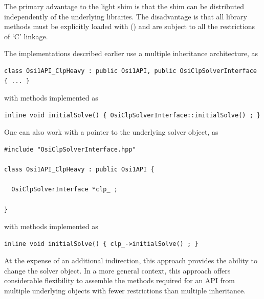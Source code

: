 \documentclass{article}
\newcommand{\OsiTwoOsi}{\pgmid{Osi2::Osi1API}\xspace}
\begin{document}
The primary advantage to the light shim is that the shim can be distributed
independently of the underlying libraries.
The disadvantage is that all library methods must be explicitly loaded with
 () and are subject to all the restrictions of
`C' linkage.

The \OsiTwoOsi implementations described earlier use a multiple inheritance
architecture, as
\begin{verbatim}
class Osi1API_ClpHeavy : public Osi1API, public OsiClpSolverInterface { ... }
\end{verbatim}
with methods implemented as
\begin{verbatim}
inline void initialSolve() { OsiClpSolverInterface::initialSolve() ; }
\end{verbatim}
One can also work with a pointer to the underlying solver object, as
\begin{verbatim}
#include "OsiClpSolverInterface.hpp"

class Osi1API_ClpHeavy : public Osi1API {

  OsiClpSolverInterface *clp_ ;

}
\end{verbatim}
with methods implemented as
\begin{verbatim}
inline void initialSolve() { clp_->initialSolve() ; }
\end{verbatim}
At the expense of an additional indirection, this approach provides the
ability to change the solver object.
In a more general context, this approach offers considerable flexibility to
assemble the methods required for an API from multiple underlying objects with
fewer restrictions than multiple inheritance.

\end{document}

